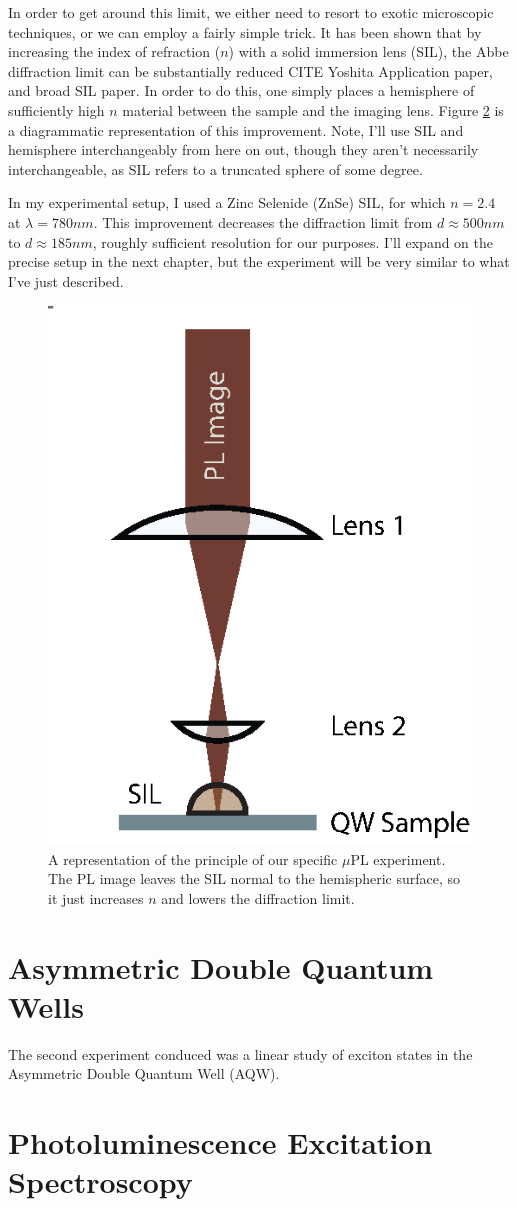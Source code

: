 \indent In order to get around this limit, we either need to resort to exotic microscopic techniques, or we can employ a fairly simple trick. It has been shown that by increasing the index of refraction ($n$) with a solid immersion lens (SIL), the Abbe diffraction limit can be substantially reduced  CITE Yoshita Application paper, and broad SIL paper. In order to do this, one simply places a hemisphere of sufficiently high $n$ material between the sample and the imaging lens. Figure \ref{} is a diagrammatic representation of this improvement. Note, I'll use SIL and hemisphere interchangeably from here on out, though they aren't necessarily interchangeable, as SIL refers to a truncated sphere of some degree. 

\indent In my experimental setup, I used a Zinc Selenide (ZnSe) SIL, for which $n = 2.4$ at $\lambda = 780 nm$. This improvement decreases the diffraction limit from $d \approx 500nm$ to $ d \approx 185 nm$, roughly sufficient resolution for our purposes. I'll expand on the precise setup in the next chapter, but the experiment will be very similar to what I've just described.
\begin{figure}[h!]
\label{confocal2}
\centering
\includegraphics[width = .3\textwidth]{confocal2.eps}
\caption{\doublespacing A representation of the principle of our specific $\mu$PL experiment. The PL image leaves the SIL normal to the hemispheric surface, so it just increases $n$ and lowers the diffraction limit.}
\end{figure}


\section{Asymmetric Double Quantum Wells}
\indent The second experiment conduced was a linear study of exciton states in the Asymmetric Double Quantum Well (AQW). 
\section{Photoluminescence Excitation Spectroscopy}